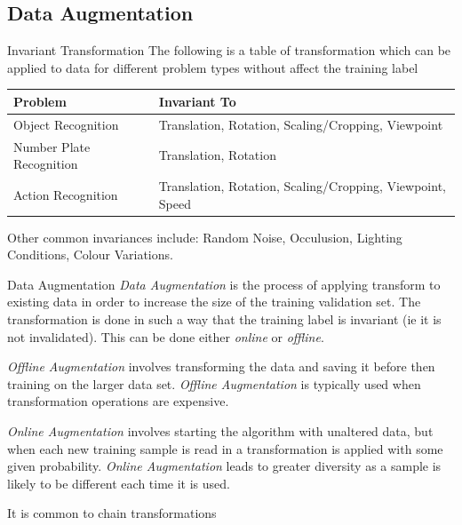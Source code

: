 \documentclass[11pt,a4paper]{article}
\begin{document}
\subsection{Data Augmentation}

\begin{proposition}{Invariant Transformation}
  The following is a table of transformation which can be applied to data for different problem types without affect the training label
  \begin{center}
    \begin{tabular}{|l|l|}
      \hline
      \textbf{Problem}&\textbf{Invariant To}\\
      \hline
      Object Recognition& Translation, Rotation, Scaling/Cropping, Viewpoint\\
      Number Plate Recognition & Translation, Rotation\\
      Action Recognition & Translation, Rotation, Scaling/Cropping, Viewpoint, Speed\\
      \hline
    \end{tabular}
  \end{center}
  Other common invariances include: Random Noise, Occulusion, Lighting Conditions, Colour Variations.
\end{proposition}

\begin{definition}{Data Augmentation}
  \textit{Data Augmentation} is the process of applying transform to existing data in order to increase the size of the training validation set. The transformation is done in such a way that the training label is invariant (ie it is not invalidated). This can be done either \textit{online} or \textit{offline}.
  \par \textit{Offline Augmentation} involves transforming the data and saving it before then training on the larger data set. \textit{Offline Augmentation} is typically used when transformation operations are expensive.
  \par \textit{Online Augmentation} involves starting the algorithm with unaltered data, but when each new training sample is read in a transformation is applied with some given probability. \textit{Online Augmentation} leads to greater diversity as a sample is likely to be different each time it is used.
  \par It is common to chain transformations
\end{definition}
\end{document}

